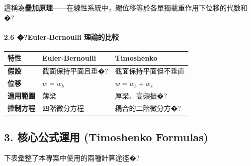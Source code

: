 \documentclass[UTF8, a4paper, 12pt]{ctexart}
\begin{document}
這稱為\textbf{疊加原理}——在線性系統中，總位移等於各單獨載重作用下位移的代數和�?



\paragraph{2.6 �?Euler-Bernoulli 理論的比較}



\begin{center}

\begin{tabular}{p{3cm}p{5cm}p{5cm}}

\toprule

\textbf{特性} & \textbf{Euler-Bernoulli} & \textbf{Timoshenko} \\

\midrule

\textbf{假設} & 截面保持平面且垂�?& 截面保持平面但不垂直 \\

\midrule

\textbf{位移} & $w = w_b$ & $w = w_b + w_s$ \\

\midrule

\textbf{適用範圍} & 薄梁 & 厚梁、高頻振�?\\

\midrule

\textbf{控制方程} & 四階微分方程 & 耦合的二階微分方�?\\

\bottomrule

\end{tabular}

\end{center}



\subsection{3. 核心公式運用 (Timoshenko Formulas)}

下表彙整了本專案中使用的兩種計算途徑�?
\end{document}
